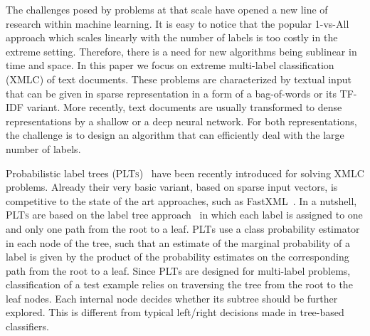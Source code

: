 \documentclass{article}
\newcommand{\Algo}[1]{\textsc{#1}}
\begin{document}
The challenges posed by problems at that scale have opened a new line of research within machine learning. It is easy to notice that the popular 1-vs-All approach which scales linearly with the number of labels is too costly in the extreme setting. Therefore, there is a need for new algorithms being sublinear in time and space. 
%
In this paper we focus on extreme multi-label classification (XMLC) of text documents. These problems are characterized by textual input that can be given in sparse representation in a form of a bag-of-words or its TF-IDF variant. More recently, text documents are usually transformed to dense representations by a shallow or a deep neural network. For both representations, the challenge is to design an algorithm that can efficiently deal with the large number of labels.

Probabilistic label trees (\Algo{PLTs})~\citep{Jasinska_et_al_2016} have been recently introduced for solving XMLC problems. Already their very basic variant, based on sparse input vectors, is competitive to the state of the art approaches, such as FastXML~\citep{Prabhu_Varma_2014}. In a nutshell, \Algo{PLTs} are based on the label tree approach~\cite{Beygelzimer_et_al_2009a,Bengio_et_al_2010,Deng_et_al_2011} in which each label is assigned to one and only one path from the root to a leaf. 
\Algo{PLT}s use a class probability estimator in each node of the tree, such that an estimate of the marginal probability of a label is given by the product of the probability estimates on the corresponding path from the root to a leaf.  Since \Algo{PLT}s are designed for multi-label problems, classification of a test example relies on traversing the tree from the root to the leaf nodes. Each internal node decides whether its subtree should be further explored. This is different from typical left/right decisions made in tree-based classifiers. 

%
\end{document}
